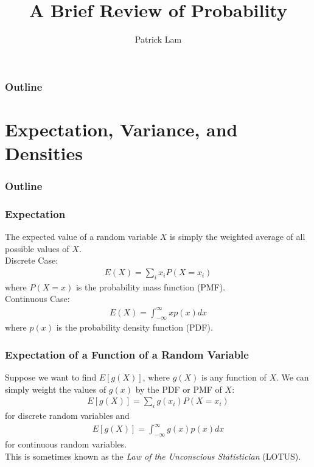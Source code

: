 \documentclass[handout]{beamer}
\author{Patrick Lam}
\title{A Brief Review of Probability}
\date{}
\begin{document}
\newcommand{\red}{\textcolor{red}}
\newcommand{\blue}{\textcolor{blue}}
\newcommand{\purple}{\textcolor{purple}}

\frame{\titlepage}

\begin{frame}
\frametitle{Outline}
\tableofcontents
\end{frame}



\section{Expectation, Variance, and Densities}


\begin{frame}
\frametitle{Outline}
\tableofcontents[currentsection]
\end{frame}

\begin{frame}
\frametitle{Expectation}
\pause
The expected value of a random variable $X$ is simply the weighted
average of all possible values of $X$.\\
\bigskip
\pause
Discrete Case:
\pause
\begin{eqnarray*}
E(X) = \sum_i x_i P(X = x_i)
\end{eqnarray*}
where $P(X = x)$ is the probability mass function (PMF).\\
\pause
\bigskip
Continuous Case:
\pause
\begin{eqnarray*}
E(X) = \int^{\infty}_{-\infty} x p(x) dx
\end{eqnarray*}
where $p(x)$ is the probability density function (PDF).
\end{frame}

\begin{frame}
\frametitle{Expectation of a Function of a Random Variable}
\pause
Suppose we want to find $E[g(X)]$, where $g(X)$ is any function of
$X$.  \pause  We can simply weight the values of $g(x)$ by the PDF or
PMF of $X$:
\pause
\begin{eqnarray*}
E[g(X)] = \sum_i g(x_i) P(X = x_i)
\end{eqnarray*}
for discrete random variables \pause and 
\begin{eqnarray*}
E[g(X)] = \int_{-\infty}^{\infty} g(x) p(x) dx
\end{eqnarray*}
for continuous random variables.  \\
\bigskip
\pause
This is sometimes known as the \textit{Law of the Unconscious
Statistician} (LOTUS).
\end{frame}
\end{document}
